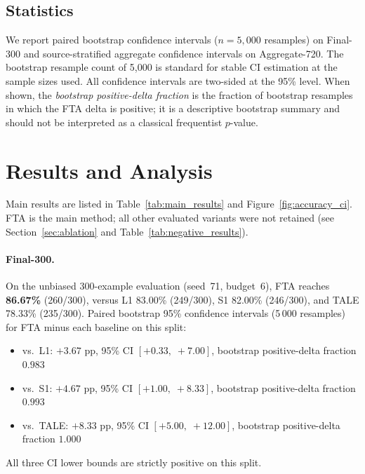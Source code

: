 \documentclass[smallcondensed]{svjour3}
\begin{document}
\subsection{Statistics}
We report paired bootstrap confidence intervals \citep{efron1993bootstrap} ($n = 5{,}000$ resamples) on Final-300 and source-stratified aggregate confidence intervals on Aggregate-720.  The bootstrap resample count of 5,000 is standard for stable CI estimation at the sample sizes used.  All confidence intervals are two-sided at the 95\% level.  When shown, the \emph{bootstrap positive-delta fraction} is the fraction of bootstrap resamples in which the FTA delta is positive; it is a descriptive bootstrap summary and should not be interpreted as a classical frequentist $p$-value.

\section{Results and Analysis}
\label{sec:results}

Main results are listed in Table~\ref{tab:main_results} and
Figure~\ref{fig:accuracy_ci}.
FTA is the main method; all other evaluated variants were not retained
(see Section~\ref{sec:ablation} and Table~\ref{tab:negative_results}).

\paragraph{Final-300.}
On the unbiased 300-example evaluation (seed~71, budget~6), FTA reaches
\textbf{86.67\%} (260/300), versus L1 83.00\% (249/300), S1 82.00\%
(246/300), and TALE 78.33\% (235/300).
Paired bootstrap 95\% confidence intervals (5\,000 resamples) for FTA
minus each baseline on this split:
\begin{itemize}[nosep,leftmargin=1.5em]
  \item vs.\ L1: $+3.67$ pp, 95\% CI $[+0.33,\;+7.00]$, bootstrap
        positive-delta fraction $0.983$
  \item vs.\ S1: $+4.67$ pp, 95\% CI $[+1.00,\;+8.33]$, bootstrap
        positive-delta fraction $0.993$
  \item vs.\ TALE: $+8.33$ pp, 95\% CI $[+5.00,\;+12.00]$, bootstrap
        positive-delta fraction $1.000$
\end{itemize}
All three CI lower bounds are strictly positive on this split.
\end{document}

